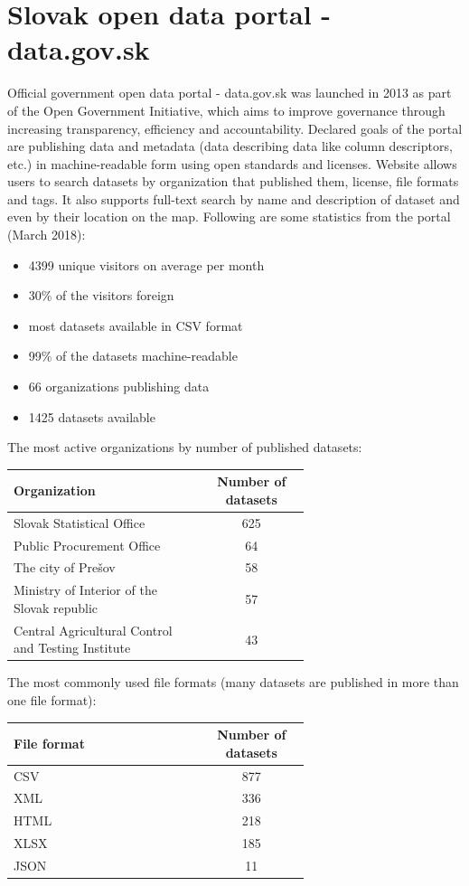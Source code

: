 \documentclass[thesis=B,english]{FITthesis}[2012/06/26]
\begin{document}
	\section{Slovak open data portal - data.gov.sk}
	Official government open data portal - data.gov.sk was launched in 2013 as part of the Open Government Initiative, which aims to improve governance through increasing transparency, efficiency and accountability. Declared goals of the portal are publishing data and metadata (data describing data like column descriptors, etc.) in machine-readable form using open standards and licenses. Website allows users to search datasets by organization that published them, license, file formats and tags. It also supports full-text search by name and description of dataset and even by their location on the map.
	Following are some statistics from the portal (March 2018):
	\begin{itemize}
		\item 4399 unique visitors on average per month
		\item 30\% of the visitors foreign 
		\item most datasets available in CSV format
		\item  99\% of the datasets machine-readable
		\item 66 organizations publishing data
		\item 1425 datasets available
	\end{itemize}
	The most active organizations by number of published datasets:
	\begin{center}
	\label{toporganizations}
        \begin{tabular}{  p{0.65\linewidth} | c }
        \textbf{Organization} & \textbf{Number of datasets} \\ \hline
        Slovak Statistical Office & 625 \\
        Public Procurement Office & 64 \\
        The city of Prešov & 58 \\
        Ministry of Interior of the Slovak republic & 57 \\
        Central Agricultural Control and Testing Institute & 43 \\
        \end{tabular}
    \end{center}
    \vspace{20px}
    The most commonly used file formats (many datasets are published in more than one file format):
    \begin{center}
        \begin{tabular}{  p{0.65\linewidth} | c }
        \textbf{File format} & \textbf{Number of datasets} \\ \hline
        CSV & 877 \\
        XML & 336 \\
        HTML & 218 \\
        XLSX & 185 \\
        JSON & 11 \\
        \end{tabular}
    \end{center}
\end{document}

